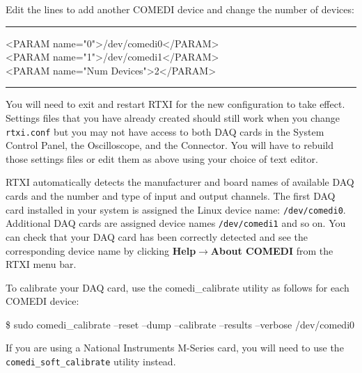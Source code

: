 Edit the lines to add another COMEDI device and change the number of devices:
\begin{example}
\bigskip\hrule\smallskip
<PARAM name="0">/dev/comedi0</PARAM>\\
<PARAM name="1">/dev/comedi1</PARAM>\\
<PARAM name="Num Devices">2</PARAM>
\bigskip\hrule\bigskip
\end{example}

You will need to exit and restart RTXI for the new configuration to take effect. Settings files that you have already created should still work when you change \texttt{rtxi.conf} but you may not have access to both DAQ cards in the System Control Panel, the Oscilloscope, and the Connector. You will have to rebuild those settings files or edit them as above using your choice of text editor.

RTXI automatically detects the manufacturer and board names of available DAQ cards and the number and type of input and output channels. The first DAQ card installed in your system is assigned the Linux device name: \texttt{/dev/comedi0}. Additional DAQ cards are assigned device names \texttt{/dev/comedi1} and so on. You can check that your DAQ card has been correctly detected and see the corresponding device name by clicking \textbf{Help}$\rightarrow$\textbf{About COMEDI} from the RTXI menu bar.

 
\label{comedi calibration}
To calibrate your DAQ card, use the comedi\_calibrate utility as follows for each COMEDI device:
\begin{example}
\$ sudo comedi\_calibrate --reset --dump --calibrate --results --verbose /dev/comedi0
\end{example}

If you are using a National Instruments M-Series card, you will need to use the \texttt{comedi\_soft\_calibrate} utility instead.